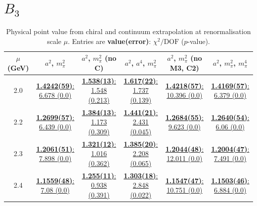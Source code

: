 \documentclass[12pt]{extarticle}
\begin{document}
\section{$B_3$}
\begin{table}[h!]
\begin{center}
\begin{tabular}{|c|c|c|c|c|c|}
\hline
$\mu$ (GeV) & $a^2$, $m_\pi^2$& $a^2$, $m_\pi^2$ (no C)& $a^2$, $a^4$, $m_\pi^2$& $a^2$, $m_\pi^2$ (no M3, C2)& $a^2$, $m_\pi^2$, $m_\pi^4$\\
\hline
2.0& \hyperlink{SSmPP/SUSY/a2m2_20.pdf.1}{\textbf{1.4242(59)}: 6.678 (0.0)} & \hyperlink{SSmPP/SUSY/a2m2noC_20.pdf.1}{\textbf{1.538(13)}: 1.548 (0.213)} & \hyperlink{SSmPP/SUSY/a2a4m2_20.pdf.1}{\textbf{1.617(22)}: 1.737 (0.139)} & \hyperlink{SSmPP/SUSY/a2m2mcut_20.pdf.1}{\textbf{1.4218(57)}: 10.396 (0.0)} & \hyperlink{SSmPP/SUSY/a2m2m4_20.pdf.1}{\textbf{1.4169(57)}: 6.379 (0.0)}\\
2.2& \hyperlink{SSmPP/SUSY/a2m2_22.pdf.1}{\textbf{1.2699(57)}: 6.439 (0.0)} & \hyperlink{SSmPP/SUSY/a2m2noC_22.pdf.1}{\textbf{1.384(13)}: 1.173 (0.309)} & \hyperlink{SSmPP/SUSY/a2a4m2_22.pdf.1}{\textbf{1.441(21)}: 2.431 (0.045)} & \hyperlink{SSmPP/SUSY/a2m2mcut_22.pdf.1}{\textbf{1.2684(55)}: 9.623 (0.0)} & \hyperlink{SSmPP/SUSY/a2m2m4_22.pdf.1}{\textbf{1.2640(54)}: 6.06 (0.0)}\\
2.3& \hyperlink{SSmPP/SUSY/a2m2_23.pdf.1}{\textbf{1.2061(51)}: 7.898 (0.0)} & \hyperlink{SSmPP/SUSY/a2m2noC_23.pdf.1}{\textbf{1.321(12)}: 1.016 (0.362)} & \hyperlink{SSmPP/SUSY/a2a4m2_23.pdf.1}{\textbf{1.385(20)}: 2.208 (0.065)} & \hyperlink{SSmPP/SUSY/a2m2mcut_23.pdf.1}{\textbf{1.2044(48)}: 12.011 (0.0)} & \hyperlink{SSmPP/SUSY/a2m2m4_23.pdf.1}{\textbf{1.2004(47)}: 7.491 (0.0)}\\
2.4& \hyperlink{SSmPP/SUSY/a2m2_24.pdf.1}{\textbf{1.1559(48)}: 7.08 (0.0)} & \hyperlink{SSmPP/SUSY/a2m2noC_24.pdf.1}{\textbf{1.255(11)}: 0.938 (0.391)} & \hyperlink{SSmPP/SUSY/a2a4m2_24.pdf.1}{\textbf{1.303(18)}: 2.848 (0.022)} & \hyperlink{SSmPP/SUSY/a2m2mcut_24.pdf.1}{\textbf{1.1547(47)}: 10.751 (0.0)} & \hyperlink{SSmPP/SUSY/a2m2m4_24.pdf.1}{\textbf{1.1503(46)}: 6.884 (0.0)}\\
\hline
\end{tabular}
\caption{Physical point value from chiral and continuum extrapolation at renormalisation scale $\mu$. Entries are \textbf{value(error)}: $\chi^2/\text{DOF}$ ($p$-value).}
\end{center}
\end{table}
\end{document}
